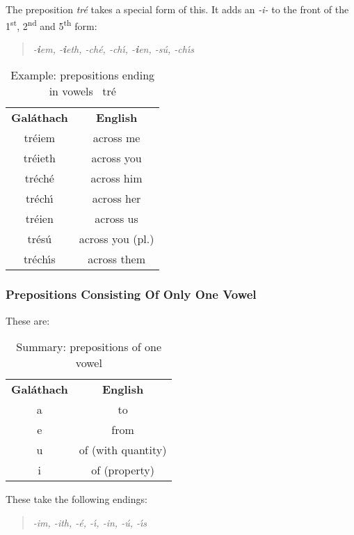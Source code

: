 The preposition \textit{tr\'{e}} takes a special form of this. It adds an \textit{-i-} to the front of the 1\textsuperscript{st}, 2\textsuperscript{nd} and 5\textsuperscript{th} form:
\begin{quote}
\textit{-\textbf{i}em, -\textbf{i}eth, -ch\'{e}, -ch\'{\i}, -\textbf{i}en, -s\'{u}, -ch\'{\i}s}
\end{quote}

\begin{table}[H]
\centering
\begin{tabular}{cc}
  \toprule
  \textbf{Gal\'{a}thach} & \textbf{English}\\
  \cmidrule(lr){1-1}\cmidrule(lr){2-2}
  tr\'{e}iem & across me\\
  tr\'{e}ieth & across you\\
  tr\'{e}ch\'{e} & across him\\
  tr\'{e}ch\'{\i} & across her\\
  tr\'{e}ien & across us\\
  tr\'{e}s\'{u} & across you (pl.)\\
  tr\'{e}ch\'{\i}s & across them\\
  \bottomrule
\end{tabular}
\caption{Example: prepositions ending in vowels \textendash\ tr\'{e}}
\label{example_prepositions_ending_in_vowels_tre}
\end{table}

\subsubsection{Prepositions Consisting Of Only One Vowel}

These are:
\begin{table}[H]
\centering
\begin{tabular}{cc}
  \toprule
  \textbf{Gal\'{a}thach} & \textbf{English}\\
  \cmidrule(lr){1-1}\cmidrule(lr){2-2}
  a & to\\
  e & from\\
  u & of (with quantity)\\
  i & of (property)\\
  \bottomrule
\end{tabular}
\caption{Summary: prepositions of one vowel}
\label{summary_prepositions_of_one_vowel}
\end{table}

These take the following endings:
\begin{quote}
\textit{-im, -ith, -\'{e}, -\'{\i}, -in, -\'{u}, -\'{\i}s}
\end{quote}

